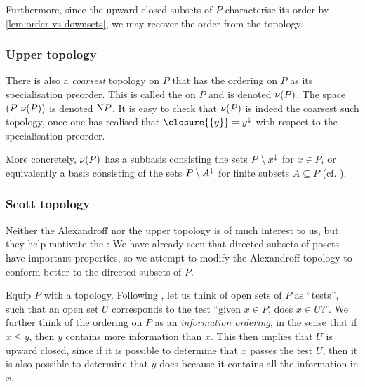 Furthermore, since the upward closed subsets of $P$ characterise its order by \cref{lem:order-vs-downsets}, we may recover the order from the topology.


\subsubsection{Upper topology}

There is also a \emph{coarsest} topology on $P$ that has the ordering on $P$ as its specialisation preorder. This is called the  on $P$ and is denoted $\nu(P)$. The space $(P,\nu(P))$ is denoted $\upperspace{P}$. It is easy to check that $\nu(P)$ is indeed the coarsest such topology, once one has realised that $\closure{\{y\}} = \downset{y}$ with respect to the specialisation preorder. %

More concretely, $\nu(P)$ has a subbasis consisting the sets $P \setminus x^\downarrow$ for $x \in P$, or equivalently a basis consisting of the sets $P \setminus A^\downarrow$ for finite subsets $A \subseteq P$ (cf. \cite[Proposition~4.2.12]{goubault-larrecq-topology}).


\subsubsection{Scott topology}

Neither the Alexandroff nor the upper topology is of much interest to us, but they help motivate the : We have already seen that directed subsets of posets have important properties, so we attempt to modify the Alexandroff topology to conform better to the directed subsets of $P$.

Equip $P$ with a topology. Following \textcite{goubault-larrecq-topology}, let us think of open sets of $P$ as \enquote{tests}, such that an open set $U$ corresponds to the test \enquote{given $x \in P$, does $x \in U$?}. We further think of the ordering on $P$ as an \emph{information ordering}, in the sense that if $x \leq y$, then $y$ contains more information than $x$. This then implies that $U$ is upward closed, since if it is possible to determine that $x$ passes the test $U$, then it is also possible to determine that $y$ does because it contains all the information in $x$.

